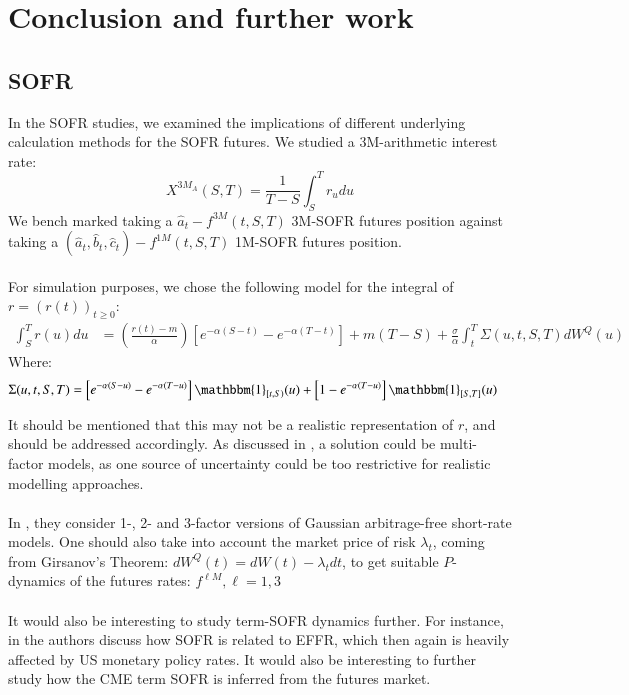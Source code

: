 \chapter{Conclusion and further work}
\label{chp_Conclusion}

\section{SOFR}
In the SOFR studies, we examined the implications of different underlying calculation methods for the SOFR futures. We studied a 3M-arithmetic interest rate: 
\[
X^{3M_{A}}(S,T) = \frac{1}{T-S}\int_{S}^{T}r_{u}du
\]
We bench marked  taking  a $\hat{a}_{t}-f^{3M}(t,S,T)$ 3M-SOFR futures position against \\ 
taking  a $(\hat{a}_{t}, \hat{b}_{t}, \hat{c}_{t})-f^{1M}(t,S,T)$ 1M-SOFR futures position.  
\\~\\
For simulation purposes, we chose the following model for the integral of $r = (r(t))_{t\geq 0}$: 
\begin{align*}
\int_{S}^{T}r(u)du 
&= 
\left(
\frac{r(t)-m}{\alpha}
\right)
\left[
e^{-\alpha(S-t)} - e^{-\alpha(T-t)}
\right]
+ m(T-S) 
+ 
\frac{\sigma}{\alpha}\int_{t}^{T}\Sigma(u,t,S,T)dW^{Q}(u)   
\end{align*}
Where: 
\begin{align*}
\Sigma(u,t,S,T) &= 
\left[
e^{-\alpha(S-u)}-e^{-\alpha(T-u)}
\right]\mathbbm{1}_{[t,S)}(u) 
+ 
\left[
1-e^{-\alpha(T-u)}
\right]\mathbbm{1}_{[S,T]}(u)
\end{align*}

It should be mentioned that this may not be a realistic representation of $r$, and should be addressed accordingly. As discussed in \cite{brigo2013interest}, a solution could be multi-factor models, as one source of uncertainty could be too restrictive for realistic modelling approaches.
\\~\\
In \cite{Skov_2020}, they consider 1-, 2- and 3-factor versions of Gaussian arbitrage-free short-rate models. One should also take into account the market price of risk $\lambda_{t}$, coming from Girsanov's Theorem: $dW^{Q}(t) = dW(t) - \lambda_{t}dt$, to get suitable  $P$-dynamics of the futures rates: $f^{\ell M}, \ell = 1,3$
\\~\\
It would also be interesting to study term-SOFR dynamics further. For instance, in \cite{gellert2021short} the authors discuss how SOFR is related to EFFR, which then again is heavily affected by US monetary policy rates. It would also be interesting to further study how the CME term SOFR is inferred from the futures market.       

